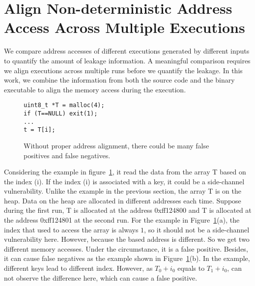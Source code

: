 \section{Align Non-deterministic Address Access Across Multiple Executions}
We compare address accesses of different executions generated by different inputs to quantify the amount of leakage information. A meaningful comparison requires we align executions across multiple runs before we quantify the leakage. In this work, we combine the information from both the source code and the binary executable to align the memory access during the execution.


\begin{figure}[h]
\begin{minipage}{0.45\linewidth}
\begin{lstlisting}[numbers=none]
uint8_t *T = malloc(4);
if (T==NULL) exit(1);
...
t = T[i];    
\end{lstlisting}
\end{minipage}
\hfill
\begin{minipage}{0.6\linewidth}
\end{minipage}
\caption{Without proper address alignment, there could be many false positives and false negatives.}\label{fig:align}
\end{figure}

Considering the example in figure~\ref{fig:align}, it read the data from the array \textsf{T} based on the index (i). If the index (i) is associated with a key, it could be a side-channel vulnerability. Unlike the example in the previous section, the array \textsf{T} is on the heap. Data on the heap are allocated in different addresses each time. Suppose during the first run, \textsf{T} is allocated at the address \textsf{0xff124800} and \textsf{T} is allocated at the address \textsf{0xff124801} at the second run. For the example in Figure~\ref{fig:align}(a), the index that used to access the array is always $1$, so it should not be a side-channel vulnerability here. However, because the based address is different. So we get two different memory accesses. Under the circumstance, it is a false positive. Besides, it can cause false negatives as the example shown in Figure~\ref{fig:align}(b). In the example, different keys lead to different index. However, as $T_0 + i_0$ equals to $T_1 + i_0$, \tool{} can not observe the difference here, which can cause a false positive.


